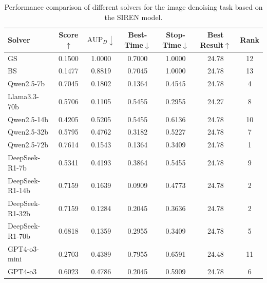 \begin{table}[h]
    \centering
    \setlength{\tabcolsep}{3pt}
    \renewcommand\arraystretch{1.5}
    \caption{Performance comparison of different solvers for the image denoising task based on the SIREN model.}
    \begin{tabular}{l|cccccc}
    \toprule
    Solver & Score$\uparrow$ & $\text{AUP}_D\downarrow$ & Best-Time$\downarrow$ & Stop-Time$\downarrow$ & Best Result$\uparrow$ & Rank \\
    \midrule
    GS & 0.1500 & 1.0000 & 0.7000 & 1.0000 & 24.78 & 12 \\
    BS & 0.1477 & 0.8819 & 0.7045 & 1.0000 & 24.78 & 13 \\
    Qwen2.5-7b & 0.7045 & 0.1802 & 0.1364 & 0.4545 & 24.78 & 4 \\
    Llama3.3-70b & 0.5706 & 0.1105 & 0.5455 & 0.2955 & 24.27 & 8 \\
    Qwen2.5-14b & 0.4205 & 0.5205 & 0.5455 & 0.6136 & 24.78 & 10 \\
    Qwen2.5-32b & 0.5795 & 0.4762 & 0.3182 & 0.5227 & 24.78 & 7 \\
    Qwen2.5-72b & 0.7614 & 0.1543 & 0.1364 & 0.3409 & 24.78 & 1 \\
    DeepSeek-R1-7b & 0.5341 & 0.4193 & 0.3864 & 0.5455 & 24.78 & 9 \\
    DeepSeek-R1-14b & 0.7159 & 0.1639 & 0.0909 & 0.4773 & 24.78 & 2 \\
    DeepSeek-R1-32b & 0.7159 & 0.1284 & 0.2045 & 0.3636 & 24.78 & 2 \\
    DeepSeek-R1-70b & 0.6818 & 0.1359 & 0.2955 & 0.3409 & 24.78 & 5 \\
    GPT4-o3-mini & 0.2703 & 0.4389 & 0.7955 & 0.6591 & 24.48 & 11 \\
    GPT4-o3 & 0.6023 & 0.4786 & 0.2045 & 0.5909 & 24.78 & 6 \\
    \bottomrule
    \end{tabular}
    \label{tab:siren_denoising}
\end{table}



